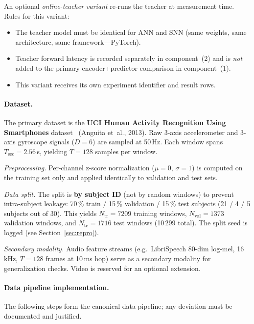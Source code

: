 \documentclass[11pt,a4paper]{article}
\begin{document}
An optional \emph{online-teacher variant} re-runs the teacher at
measurement time.  Rules for this variant:
\begin{itemize}[nosep]
\item The teacher model must be identical for ANN and SNN (same weights,
  same architecture, same framework---PyTorch).
\item Teacher forward latency is recorded separately in component~(2)
  and is \emph{not} added to the primary encoder+predictor comparison
  in component~(1).
\item This variant receives its own experiment identifier and result
  rows.
\end{itemize}

\paragraph{Dataset.}\label{sec:dataset}
The primary dataset is the \textbf{UCI Human Activity Recognition Using
Smartphones} dataset~\cite{anguita2013har} (Anguita et~al., 2013).  Raw 3-axis accelerometer and
3-axis gyroscope signals ($D=6$) are sampled at 50\,Hz.  Each window spans
$T_{\text{sec}}=2.56$\,s, yielding $T=128$ samples per window.

\emph{Preprocessing.}
Per-channel z-score normalization ($\mu=0$, $\sigma=1$) is computed on the
training set only and applied identically to validation and test sets.

\emph{Data split.}
The split is \textbf{by subject ID} (not by random windows) to prevent
intra-subject leakage: 70\,\% train / 15\,\% validation / 15\,\% test
subjects (21 / 4 / 5 subjects out of 30).
This yields $N_{\text{tr}} = 7209$ training windows,
$N_{\text{val}} = 1373$ validation windows, and
$N_{\text{te}} = 1716$ test windows
(10\,299 total).
The split seed is logged (see Section~\ref{sec:repro}).

\emph{Secondary modality.}
Audio feature streams (e.g.\ LibriSpeech 80-dim log-mel, 16\,kHz,
$T=128$ frames at 10\,ms hop) serve as a secondary modality for
generalization checks.  Video is reserved for an optional extension.

\paragraph{Data pipeline implementation.}\label{sec:data-pipeline}
The following steps form the canonical data pipeline; any deviation
must be documented and justified.
\end{document}
